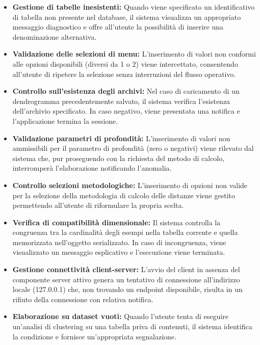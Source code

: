 \begin{itemize}
    \item \textbf{Gestione di tabelle inesistenti:} 
    Quando viene specificato un identificativo di tabella non presente nel database, il sistema visualizza un appropriato messaggio diagnostico e offre all'utente la possibilità di inserire una denominazione alternativa.
    
    \item \textbf{Validazione delle selezioni di menu:} 
    L'inserimento di valori non conformi alle opzioni disponibili (diversi da 1 o 2) viene intercettato, consentendo all'utente di ripetere la selezione senza interruzioni del flusso operativo.
    
    \item \textbf{Controllo sull'esistenza degli archivi:} 
    Nel caso di caricamento di un dendrogramma precedentemente salvato, il sistema verifica l'esistenza dell'archivio specificato. In caso negativo, viene presentata una notifica e l'applicazione termina la sessione.
    
    \item \textbf{Validazione parametri di profondità:} 
    L'inserimento di valori non ammissibili per il parametro di profondità (zero o negativi) viene rilevato dal sistema che, pur proseguendo con la richiesta del metodo di calcolo, interromperà l'elaborazione notificando l'anomalia.
    
    \item \textbf{Controllo selezioni metodologiche:} 
    L'inserimento di opzioni non valide per la selezione della metodologia di calcolo delle distanze viene gestito permettendo all'utente di riformulare la propria scelta.
    
    \item \textbf{Verifica di compatibilità dimensionale:} 
    Il sistema controlla la congruenza tra la cardinalità degli esempi nella tabella corrente e quella memorizzata nell'oggetto serializzato. In caso di incongruenza, viene visualizzato un messaggio esplicativo e l'esecuzione viene terminata.
    
    \item \textbf{Gestione connettività client-server:} 
    L'avvio del client in assenza del componente server attivo genera un tentativo di connessione all'indirizzo locale (127.0.0.1) che, non trovando un endpoint disponibile, risulta in un rifiuto della connessione con relativa notifica.
    
    \item \textbf{Elaborazione su dataset vuoti:} 
    Quando l'utente tenta di eseguire un'analisi di clustering su una tabella priva di contenuti, il sistema identifica la condizione e fornisce un'appropriata segnalazione.
\end{itemize}

